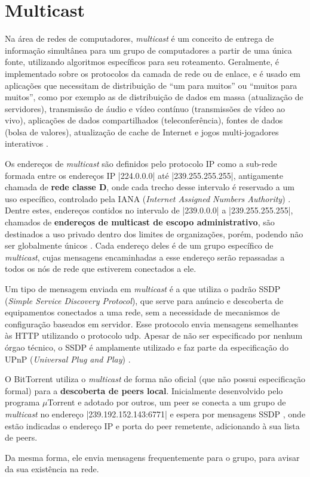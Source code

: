 
\newpage
\section{Multicast}

Na área de redes de computadores, \emph{multicast} é um conceito de entrega de
informação simultânea para um grupo de computadores a partir de uma única fonte,
utilizando algoritmos específicos para seu roteamento. Geralmente, é implementado sobre
os protocolos da camada de rede ou de enlace, e é usado em aplicações que necessitam de
distribuição de ``um para muitos'' ou ``muitos para muitos'', como por exemplo as de
distribuição de dados em massa (atualização de servidores), transmissão de áudio e vídeo
contínuo (transmissões de vídeo ao vivo), aplicações de dados compartilhados
(teleconferência), fontes de dados (bolsa de valores), atualização de cache de Internet
e jogos multi-jogadores interativos \cite{book:kurose}.

Os endereços de \emph{multicast} são definidos pelo protocolo IP como a sub-rede formada
entre os endereços IP \sverb|224.0.0.0| até \sverb|239.255.255.255|, antigamente chamada
de \textbf{rede classe D}, onde cada trecho desse intervalo é reservado a um uso
específico, controlado pela IANA (\emph{Internet Assigned Numbers Authority})
\cite{site:iana-multicast}. Dentre estes, endereços contidos no intervalo de
\sverb|239.0.0.0| a \sverb|239.255.255.255|, chamados de
\textbf{endereços de multicast de escopo administrativo}, são destinados a uso privado
dentro dos limites de organizações, porém, podendo não ser globalmente únicos
\cite{site:rfcmulticast}. Cada endereço deles é de um grupo específico de
\emph{multicast}, cujas mensagens encaminhadas a esse endereço serão repassadas a todos
os nós de rede que estiverem conectados a ele.

Um tipo de mensagem enviada em \emph{multicast} é a que utiliza o padrão SSDP
(\emph{Simple Service Discovery Protocol}), que serve para anúncio e descoberta de
equipamentos conectados a uma rede, sem a necessidade de mecanismos de configuração
baseados em servidor. Esse protocolo envia mensagens semelhantes às HTTP utilizando o
protocolo \gls{udp}. Apesar de não ser especificado por nenhum órgao técnico, o SSDP é
amplamente utilizado e faz parte da especificação do UPnP
(\emph{Universal Plug and Play}) \cite{site:upnp}.

O BitTorrent utiliza o \emph{multicast} de forma não oficial (que não possui
especificação formal) para a \textbf{descoberta de \glspl*{peer} local}. Inicialmente
desenvolvido pelo programa $\mu$Torrent e adotado por outros, um \gls*{peer} se
conecta a um grupo de \emph{multicast} no endereço \sverb|239.192.152.143:6771| e
espera por mensagens SSDP \cite{site:utorrent-forum}, onde estão indicadas o endereço
IP e porta do \gls*{peer} remetente, adicionando à sua lista de \glspl*{peer}.


\newpage
Da mesma forma, ele envia mensagens frequentemente para o grupo, para avisar da sua
existência na rede.

